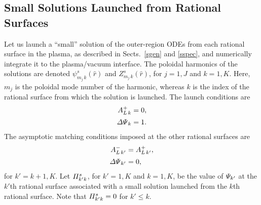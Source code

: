 \documentclass[12pt,prb,aps]{revtex4-1}
\begin{document}
\subsection{Small Solutions Launched from Rational Surfaces}\label{smalll}
Let us launch a ``small'' solution of the outer-region ODEs  from each rational surface in the plasma, as described in Sects.~\ref{sgen} and \ref{sspec}, 
 and numerically integrate it to the plasma/vacuum interface. The poloidal harmonics of
the solutions are denoted $\psi^s_{m_{j}\,k}(\hat{r})$ and $Z^s_{m_{j}\,k}(\hat{r})$, for $j=1,J$ and $k=1,K$. Here,
$m_{j}$ is the poloidal mode number of the harmonic, whereas $k$ is the index of the rational surface from which the solution is launched.
The launch conditions are
\begin{align}
A_{L\,k}^+ &=  0,\\[0.5ex]
{\mit\Delta\Psi}_k &=1.
\end{align}
The asymptotic matching conditions imposed at the other rational surfaces are
\begin{align}
A_{L\,k'}^{-} &= A_{L\,k'}^+,\\[0.5ex]
{\mit\Delta\Psi}_{k'} &= 0,
\end{align}
for $k'=k+1,K$.
Let 
${\mit\Pi}_{k'k}^s$, for $k'=1,K$ and $k=1,K$,  be the value of ${\mit\Psi}_{k'}$ at the $k'$th rational surface associated with a small solution
launched from the $k$th rational surface. Note that ${\mit\Pi}_{k'k}^s=0$ for $k' \leq k$.  
\end{document}
